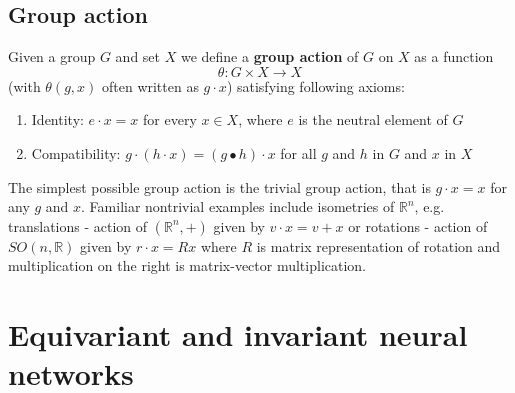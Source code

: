     \subsection{Group action}
        Given a group $G$ and set $X$ we define a \textbf{group action} of $G$ on $X$ as
        a function
        \begin{equation}
            \theta: G \times X \to X
        \end{equation}
        (with $\theta(g,x)$ often written as $g\cdot x$) satisfying following axioms:
        \begin{enumerate}
            \item Identity: $e \cdot x = x$ for every $x \in X$, where $e$ is the neutral element
                    of $G$ 
            \item Compatibility: $g \cdot \left(h \cdot x\right) = 
                \left(g \bullet h \right) \cdot x$ for all $g$ and $h$ in $G$ and $x$ in $X$
        \end{enumerate}
        The simplest possible group action is the trivial group action, that is 
        $g\cdot x = x$ for any $g$ and $x$. Familiar nontrivial examples include isometries
        of $\mathbb{R}^n$, e.g.
        translations - action of $\left(\mathbb{R}^n,+\right)$ given by $v \cdot x = v+x$ or
        rotations - action of $SO(n,\mathbb{R})$ given by $r \cdot x = Rx$ where
        $R$ is matrix representation of rotation and
        multiplication on the right is matrix-vector multiplication.

\section{Equivariant and invariant neural networks}
